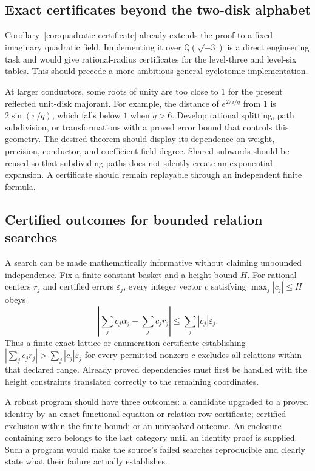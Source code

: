 \subsection{Exact certificates beyond the two-disk alphabet}

Corollary~\ref{cor:quadratic-certificate} already extends the proof
to a fixed imaginary quadratic field. Implementing it over
$\mathbb Q(\sqrt{-3})$ is a direct engineering task and would give
rational-radius certificates for the level-three and level-six
tables. This should precede a more ambitious general cyclotomic
implementation.

At larger conductors, some roots of unity are too close to $1$ for
the present reflected unit-disk majorant. For example, the distance
of $e^{2\pi i/q}$ from $1$ is $2\sin(\pi/q)$, which falls below $1$
when $q>6$. Develop rational splitting, path subdivision, or
transformations with a proved error bound that controls this
geometry. The desired theorem should display its dependence on
weight, precision, conductor, and coefficient-field degree. Shared
subwords should be reused so that subdividing paths does not
silently create an exponential expansion. A certificate should
remain replayable through an independent finite formula.

\subsection{Certified outcomes for bounded relation searches}

A search can be made mathematically informative without claiming
unbounded independence. Fix a finite constant basket and a height
bound $H$. For rational centers $r_j$ and certified errors
$\varepsilon_j$, every integer vector $c$ satisfying
$\max_j|c_j|\le H$ obeys
\[
 \left|\sum_jc_j\alpha_j-\sum_jc_jr_j\right|
 \le\sum_j|c_j|\varepsilon_j.
\]
Thus a finite exact lattice or enumeration certificate establishing
$|\sum_jc_jr_j|>\sum_j|c_j|\varepsilon_j$ for every permitted
nonzero $c$ excludes all relations within that declared range.
Already proved dependencies must first be handled with the
height constraints translated correctly to the remaining
coordinates.

A robust program should have three outcomes: a candidate upgraded
to a proved identity by an exact functional-equation or relation-row
certificate; certified exclusion within the finite bound; or an
unresolved outcome. An enclosure containing zero belongs to the
last category until an identity proof is supplied. Such a program
would make the source's failed searches reproducible and clearly
state what their failure actually establishes.

